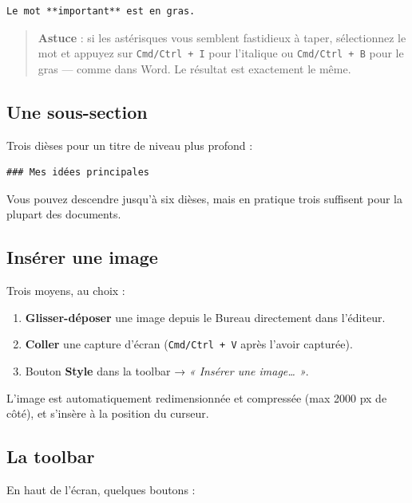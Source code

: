 \documentclass[11pt,a4paper]{article}
\theoremstyle{definition}
\begin{document}
\begin{lstlisting}
Le mot **important** est en gras.
\end{lstlisting}


\begin{quote}
\textbf{Astuce} : si les astérisques vous semblent fastidieux à taper,
sélectionnez le mot et appuyez sur \texttt{Cmd/Ctrl + I} pour l'italique
ou \texttt{Cmd/Ctrl + B} pour le gras — comme dans Word. Le résultat
est exactement le même.
\end{quote}


\subsection{Une sous-section}

Trois dièses pour un titre de niveau plus profond :


\begin{lstlisting}
### Mes idées principales
\end{lstlisting}


Vous pouvez descendre jusqu'à six dièses, mais en pratique trois
suffisent pour la plupart des documents.


\subsection{Insérer une image}

Trois moyens, au choix :


\begin{enumerate}
  \item \textbf{Glisser-déposer} une image depuis le Bureau directement dans
l'éditeur.
  \item \textbf{Coller} une capture d'écran (\texttt{Cmd/Ctrl + V} après l'avoir
capturée).
  \item Bouton \textbf{Style} dans la toolbar → \emph{« Insérer une image… »}.
\end{enumerate}


L'image est automatiquement redimensionnée et compressée (max 2000 px
de côté), et s'insère à la position du curseur.


\subsection{La toolbar}

En haut de l'écran, quelques boutons :
\end{document}
